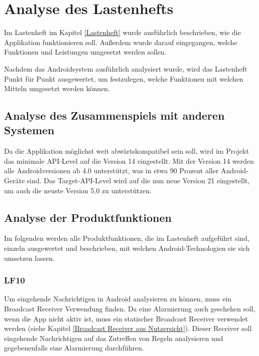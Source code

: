 \section{Analyse des Lastenhefts}
Im Lastenheft im Kapitel \ref{Lastenheft} wurde ausf\"uhrlich beschrieben, wie die Applikation funktionieren soll. Au\ss{}erdem wurde darauf eingegangen, welche Funktionen und Leistungen umgesetzt werden sollen. 

Nachdem das Androidsystem ausf\"uhrlich analysiert wurde, wird das Lastenheft Punkt f\"ur Punkt ausgewertet, um festzulegen, welche Funktionen mit welchen Mitteln umgesetzt werden k\"onnen.

\subsection{Analyse des Zusammenspiels mit anderen Systemen}
Da die Applikation m\"oglichst weit abw\"artskompatibel sein soll, wird im Projekt das minimale \ac{API}-Level auf die Version 14 eingestellt. Mit der Version 14 werden alle Androidversionen ab 4.0 unterst\"utzt, was in etwa 90 Prozent aller Android-Ger\"ate sind. Das Target-\ac{API}-Level wird auf die nun neue Version 21 eingestellt, um auch die neuste Version 5.0 zu unterst\"utzen. \cite{AndroidVerteilung} 

\subsection{Analyse der Produktfunktionen}
Im folgenden werden alle Produktfunktionen, die im Lastenheft aufgef\"uhrt sind, einzeln ausgewertet und beschrieben, mit welchen Android-Technologien sie sich umsetzen lassen.

\subsubsection{LF10}
Um eingehende Nachrichtigen in Android analysieren zu k\"onnen, muss ein Broadcast Receiver Verwendung finden. Da eine Alarmierung auch geschehen soll, wenn die App nicht aktiv ist, muss ein statischer Broadcast Receiver verwendet werden (siehe Kapitel \ref{Broadcast Receiver aus Nutzersicht}). Dieser Receiver soll eingehende Nachrichtigen auf das Zutreffen von Regeln analysieren und gegebenenfalls eine Alarmierung durchf\"uhren. 

